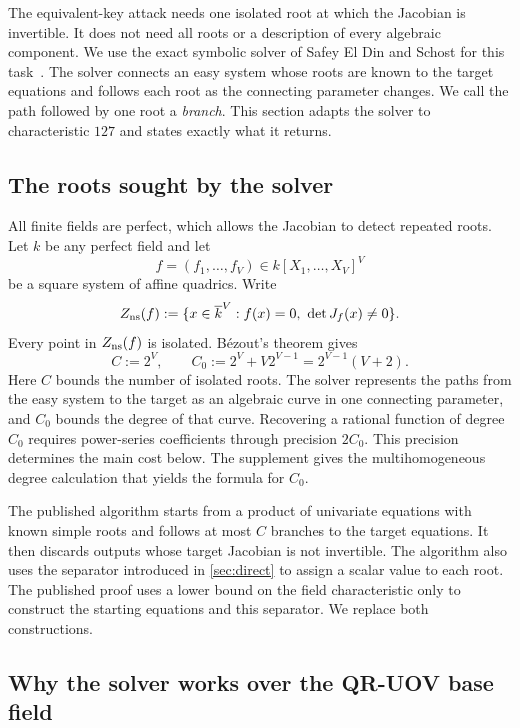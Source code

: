 \documentclass[11pt,a4paper]{article}
\theoremstyle{definition}
\theoremstyle{remark}
\begin{document}
The equivalent-key attack needs one isolated root at which the Jacobian is
invertible.  It does not need all roots or a description of every algebraic
component.  We use the exact symbolic solver of Safey El Din and Schost for
this task~\cite{SafeySchost2018}.  The solver connects an easy system whose
roots are known to the target equations and follows each root as the
connecting parameter changes.  We call the path followed by one root a
\emph{branch}.  This section adapts the solver to characteristic $127$ and
states exactly what it returns.

\subsection{The roots sought by the solver}
All finite fields are perfect, which allows the Jacobian to detect repeated
roots.  Let $k$ be any perfect field and let
\[
 f=(f_1,\ldots,f_V)\in k[X_1,\ldots,X_V]^V
\]
be a square system of affine quadrics.  Write
\begin{equation}\label{eq:ns-locus}
 Z_{\rm ns}(f)
 :=\{x\in\overline k^V:f(x)=0,\ \det J_f(x)\ne0\}.
\end{equation}
Every point in $Z_{\rm ns}(f)$ is isolated.  B\'ezout's theorem gives
\begin{equation}\label{eq:C-C0}
 C:=2^V,
 \qquad
 C_0:=2^V+V2^{V-1}=2^{V-1}(V+2).
\end{equation}
Here $C$ bounds the number of isolated roots.  The solver represents the paths
from the easy system to the target as an algebraic curve in one connecting
parameter, and $C_0$ bounds the degree of that curve.  Recovering a rational
function of degree $C_0$ requires power-series coefficients through precision
$2C_0$.  This precision determines the main cost below.  The supplement gives
the multihomogeneous degree calculation that yields the formula for $C_0$.

The published algorithm starts from a product of univariate equations with
known simple roots and follows at most $C$ branches to the target equations.
It then discards outputs whose target Jacobian is not invertible.  The algorithm
also uses the separator introduced in \cref{sec:direct} to assign a scalar
value to each root.
The published proof uses a lower bound on the field characteristic only to
construct the starting equations and this separator.  We replace both
constructions.

\subsection{Why the solver works over the QR-UOV base field}
\end{document}
